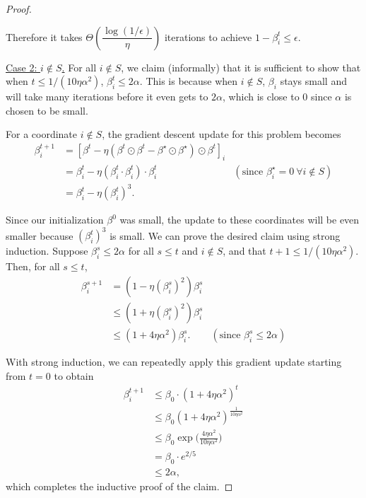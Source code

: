 \begin{proof}
\begin{itemize}
Therefore it takes $\Theta\left(\dfrac{\log (1/\epsilon)}{\eta}\right)$ iterations to achieve $1-\beta_i^t\le \epsilon.$
\end{itemize}

\underline{Case 2: $i \notin S$.} For all $i \notin S$, we claim (informally) that it is sufficient to show that when $t \leq 1 / (10 \eta \alpha^{2})$, $\beta_{i}^{t} \leq 2\alpha$. This is because when $i \notin S$, $\beta_{i}$ stays small and will take many iterations before it even gets to $2\alpha$, which is close to $0$ since $\alpha$ is chosen to be small.

For a coordinate $i\notin S$, the gradient descent update for this problem becomes
\begin{align}
    \beta_i^{t+1} &= \left[ \beta^{t} - \eta (\beta^{t} \odot \beta^{t} - \beta^\star \odot \beta^\star) \odot \beta^{t} \right]_i \\
    &= \beta_i^{t} - \eta (\beta_i^{t} \cdot \beta_i^{t}) \cdot \beta_i^{t} & (\text{since } \beta_{i}^\star = 0 \ \forall i \notin S) \\
    &= \beta_i^{t} - \eta (\beta_i^{t})^{3}.
\end{align}

Since our initialization $\beta^{0}$ was small, the update to these coordinates will be even smaller because $(\beta_{i}^{t})^{3}$ is small. We can prove the desired claim using strong induction. Suppose $\beta_{i}^{s} \leq 2\alpha$ for all $s \leq t$ and $i \notin S$, and that $t+1 \leq 1 / (10\eta \alpha^{2})$. Then, for all $s \leq t$,
\begin{align}
\beta_{i}^{s+1} %
    &= (1 - \eta (\beta_{i}^{s})^{2})\beta_{i}^{s} \\
    &\leq (1 + \eta (\beta_{i}^{s})^{2}) \beta_{i}^{s} \\
    &\leq (1 + 4\eta \alpha^{2}) \beta_{i}^{s}. & (\text{since } \beta_{i}^{s} \leq 2\alpha)
\end{align}

With strong induction, we can repeatedly apply this gradient update starting from $t=0$ to obtain
\begin{align}
    \beta_{i}^{t+1} &\leq \beta_{0} \cdot (1 + 4 \eta \alpha^{2})^t \\
    &\leq \beta_{0} ( 1 + 4 \eta \alpha^{2})^{\frac{1}{10 \eta \alpha^{2} }} \\
    &\leq \beta_{0} \exp \bigg(\frac{4\eta \alpha^{2}}{10 \eta \alpha^{2}} \bigg) \\
    &=  \beta_{0} \cdot e^{2/5} \\
    &\leq 2 \alpha,
 \end{align}
 which completes the inductive proof of the claim.

\end{proof}